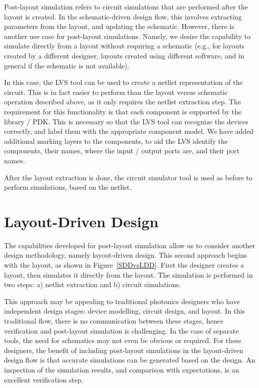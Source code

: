 \documentclass[journal]{spie}
\begin{document}
Post-layout simulation refers to circuit simulations that are performed after the layout is created.  In the schematic-driven design flow, this involves extracting parameters from the layout, and updating the schematic.  However, there is another use case for post-layout simulations.  Namely, we desire the capability to simulate directly from a layout without requiring a schematic (e.g., for layouts created by a different designer,  layouts created using different software, and in general if the schematic is not available).

In this case, the LVS tool can be used to create a netlist representation of the circuit.  This is in fact easier to perform than the layout versus schematic operation described above, as it only requires the netlist extraction step.  The requirement for this functionality is that each component is supported by the library / PDK.  This is necessary so that the LVS tool can recognize the devices correctly, and label them with the appropriate component model.  We have added additional marking layers to the components, to aid the LVS identify the components, their names, where the input / output ports are, and their port names.

After the layout extraction is done, the circuit simulator tool is used as before to perform simulations, based on the netlist.

\section{Layout-Driven Design}

The capabilities developed for post-layout simulation allow us to consider another design methodology, namely layout-driven design.   This second approach begins with the layout, as shown in Figure~\ref{SDDvsLDD}.  First the designer creates a layout, then simulates it directly from the layout.  The simulation is performed in two steps: a) netlist extraction and b) circuit simulations.  

This approach may be appealing to traditional photonics designers who have independent design stages: device modelling, circuit design, and layout.  In this traditional flow, there is no communication between these stages, hence verification and post-layout simulation is challenging.  In the case of separate tools, the need for schematics may not even be obvious or required.  For these designers, the benefit of including post-layout simulations in the layout-driven design flow is that accurate simulations can be generated based on the design.  An inspection of the simulation results, and comparison with expectations, is an excellent verification step.
\end{document}
